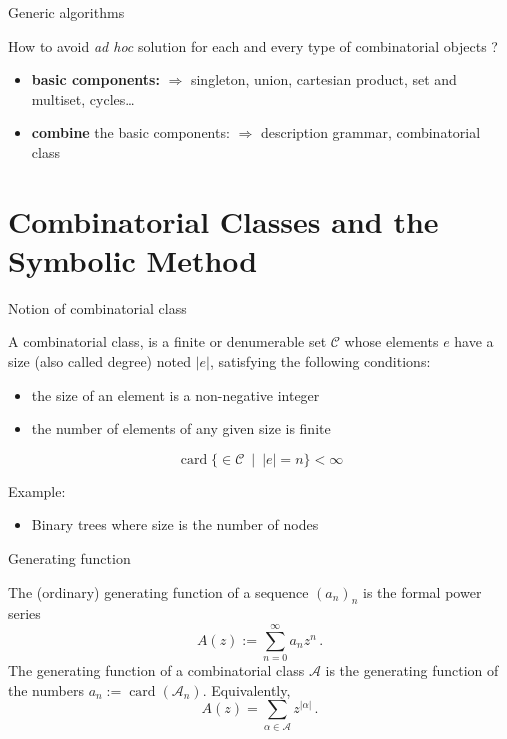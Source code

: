 \documentclass[compress,11pt]{beamer}
\def\opstyle#1{\ensuremath{\operatorname{#1}}}
\newcommand{\card}{\opstyle{card}}
\newcommand{\mA}{\mathcal{A}}
\newcommand{\mC}{\mathcal{C}}
\renewcommand{\emph}[1]{{\color{red} #1}}
\begin{document}
\begin{frame}{Generic algorithms}
  \begin{QUESTION}
    \Large
    How to avoid \textit{ad hoc} solution for each and every type of
    combinatorial objects ?
  \end{QUESTION}
  \pause\bigskip
   \begin{itemize}
   \item \textbf{basic components:}
     $\Longrightarrow$ singleton, union, cartesian product, set and
     multiset, cycles\dots\pause\bigskip
   \item \textbf{combine} the basic components:
     $\Longrightarrow$ description grammar, combinatorial class
   \end{itemize}
  \pause\bigskip

\end{frame}


\section{Combinatorial Classes and the Symbolic Method}

\begin{frame}{Notion of combinatorial class}
  \begin{DEFN}
    A \emph{combinatorial class}, is a finite or denumerable set $\mC$ whose
    elements $e$ have a size (also called degree) noted $|e|$, satisfying the
    following conditions:
    \begin{itemize}
    \item the size of an element is a non-negative integer
    \item the number of elements of any given size is finite
    \end{itemize}
    \[
    \card\{\in \mC\ \mid\ |e| = n\} < \infty
    \]
  \end{DEFN}
  \bigskip

  Example:
  \begin{itemize}
  \item Binary trees where size is the number of nodes
  \end{itemize}
\end{frame}

\begin{frame}{Generating function}
  
  \begin{DEFN}
    The (ordinary) \emph{generating function} of a sequence $(a_n)_n$ 
    is the formal power series
    \begin{equation*}
      A(z) := \sum_{n=0}^{\infty} a_n z^n\,.
    \end{equation*}
    The \emph{generating function} of a combinatorial class $\mA$ is the
    generating function of the numbers $a_n := \card(\mA_n)$. Equivalently,
    \begin{equation*}
      A(z) = \sum_{\alpha\in\mA} z^{|\alpha|}\,.
    \end{equation*}
  \end{DEFN}
\end{frame}
\end{document}
